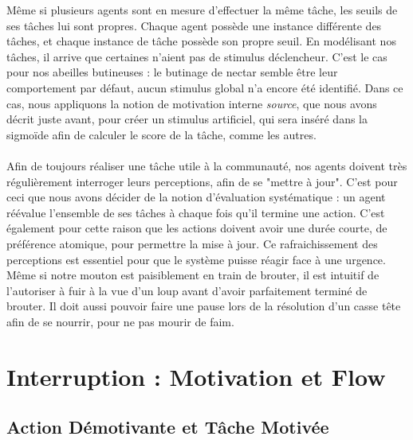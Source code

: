 			Même si plusieurs agents sont en mesure d'effectuer la même tâche, les seuils de ses tâches lui sont propres. Chaque agent possède une instance différente des tâches, et chaque instance de tâche possède son propre seuil. En modélisant nos tâches, il arrive que certaines n'aient pas de stimulus déclencheur. C'est le cas pour nos abeilles butineuses : le butinage de nectar semble être leur comportement par défaut, aucun stimulus global n'a encore été identifié. Dans ce cas, nous appliquons la notion de motivation interne \textit{source}, que nous avons décrit juste avant, pour créer un stimulus artificiel, qui sera inséré dans la sigmoïde afin de calculer le score de la tâche, comme les autres.
			
			\paragraph{}
			Afin de toujours réaliser une tâche utile à la communauté, nos agents doivent très régulièrement interroger leurs perceptions, afin de se "mettre à jour". C'est pour ceci que nous avons décider de la notion d'évaluation systématique : un agent réévalue l'ensemble de ses tâches à chaque fois qu'il termine une action. C'est également pour cette raison que les actions doivent avoir une durée courte, de préférence atomique, pour permettre la mise à jour. Ce rafraichissement des perceptions est essentiel pour que le système puisse réagir face à une urgence. Même si notre mouton est paisiblement en train de brouter, il est intuitif de l'autoriser à fuir à la vue d'un loup avant d'avoir parfaitement terminé de brouter. Il doit aussi pouvoir faire une pause lors de la résolution d'un casse tête afin de se nourrir, pour ne pas mourir de faim.
		
	\section{Interruption : Motivation et Flow}
	\label{sectionInterruption}
		\subsection{Action Démotivante et Tâche Motivée}
		
